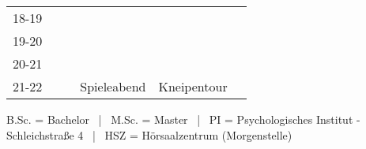 \begin{table}[!h]
\begin{tabular}{|l|p{}|p{}|p{}|p{}|p{}|}
	18-19 &                                                                                             &                                                                                                      & \cellcolor[HTML]{EFEFEF}                              & \cellcolor[HTML]{EFEFEF}                                 & \cellcolor[HTML]{EFEFEF}{\color[HTML]{333333} }                              \\ \cline{1-3}
	19-20 &                                                                                             &                                                                                                      & \cellcolor[HTML]{EFEFEF}                              & \cellcolor[HTML]{EFEFEF}                                 & \cellcolor[HTML]{EFEFEF}{\color[HTML]{333333} }                              \\ \cline{1-3}
	20-21 &                                                                                             &                                                                                                      & \cellcolor[HTML]{EFEFEF}                              & \cellcolor[HTML]{EFEFEF}                                 & \cellcolor[HTML]{EFEFEF}{\color[HTML]{333333} }                              \\ \cline{1-3}
	21-22 &                                                                                             &                                                                                                      & \multirow{-4}{*}{\cellcolor[HTML]{EFEFEF}\footnotesize{Spieleabend}} & \multirow{-4}{*}{\cellcolor[HTML]{EFEFEF}\footnotesize{Kneipentour}}    & \multirow{-4}{*}{\cellcolor[HTML]{EFEFEF}{\color[HTML]{333333} \footnotesize{Stadtrallye}}} \\ \hline
	\end{tabular}
	\end{table}
\scriptsize{B.Sc. = Bachelor ~|~ M.Sc. = Master ~|~ PI = Psychologisches Institut - Schleichstraße 4 ~|~ HSZ = Hörsaalzentrum (Morgenstelle)}

